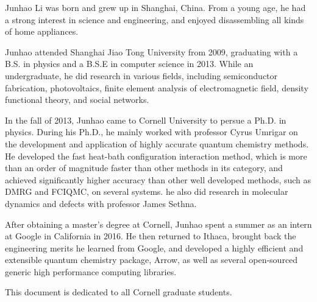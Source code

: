 \documentclass[phd,tocprelim]{cornell}
\begin{document}
\begin{biosketch}
Junhao Li was born and grew up in Shanghai, China.
From a young age, he had a strong interest in science and engineering, and enjoyed disassembling all kinds of home appliances.

Junhao attended Shanghai Jiao Tong University from 2009, graduating with a B.S. in physics and a B.S.E in computer science in 2013.
While an undergraduate, he did research in various fields, including semiconductor fabrication, photovoltaics, finite element analysis of electromagnetic field, density functional theory, and social networks.

In the fall of 2013, Junhao came to Cornell University to persue a Ph.D. in physics.
During his Ph.D., he mainly worked with professor Cyrus Umrigar on the development and application of highly accurate quantum chemistry methods.
He developed the fast heat-bath configuration interaction method, which is more than an order of magnitude faster than other methods in its category, and achieved significantly higher accuracy than other well developed methods, such as DMRG and FCIQMC, on several systems.
he also did research in molecular dynamics and defects with professor James Sethna.

After obtaining a master's degree at Cornell, Junhao spent a summer as an intern at Google in California in 2016.
He then returned to Ithaca, brought back the engineering merits he learned from Google, and developed a highly efficient and extensible quantum chemistry package, Arrow, as well as several open-sourced generic high performance computing libraries.
\end{biosketch}

\begin{dedication}
This document is dedicated to all Cornell graduate students.
\end{dedication}
\end{document}
